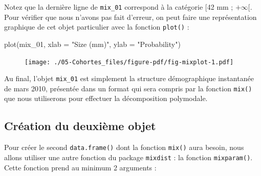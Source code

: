 \documentclass[
  a4paper,
  DIV=11,
  numbers=noendperiod,
  oneside]{scrreprt}
\newenvironment{Shaded}{}{}
\newcommand{\AttributeTok}[1]{\textcolor[rgb]{0.84,0.23,0.29}{#1}}
\newcommand{\FunctionTok}[1]{\textcolor[rgb]{0.44,0.26,0.76}{#1}}
\newcommand{\NormalTok}[1]{\textcolor[rgb]{0.14,0.16,0.18}{#1}}
\newcommand{\StringTok}[1]{\textcolor[rgb]{0.01,0.18,0.38}{#1}}
\begin{document}
Notez que la dernière ligne de \texttt{mix\_01} correspond à la
catégorie {[}42 mm ; \(+\infty\){[}. Pour vérifier que nous n'avons pas
fait d'erreur, on peut faire une représentation graphique de cet objet
particulier avec la fonction \texttt{plot()} :

\begin{Shaded}
\begin{Highlighting}[]
\FunctionTok{plot}\NormalTok{(mix\_01, }\AttributeTok{xlab =} \StringTok{"Size (mm)"}\NormalTok{, }\AttributeTok{ylab =} \StringTok{"Probability"}\NormalTok{)}
\end{Highlighting}
\end{Shaded}

\begin{figure}


{\centering \texttt{[image: ./05-Cohortes\_files/figure-pdf/fig-mixplot-1.pdf]}

}

\end{figure}


Au final, l'objet \texttt{mix\_01} est simplement la structure
démographique instantanée de mars 2010, présentée dans un format qui
sera compris par la fonction \texttt{mix()} que nous utiliserons pour
effectuer la décomposition polymodale.

\hypertarget{cruxe9ation-du-deuxiuxe8me-objet}{%
\subsection{Création du deuxième
objet}\label{cruxe9ation-du-deuxiuxe8me-objet}}

Pour créer le second \texttt{data.frame()} dont la fonction
\texttt{mix()} aura besoin, nous allons utiliser une autre fonction du
package \texttt{mixdist} : la fonction \texttt{mixparam()}. Cette
fonction prend au minimum 2 arguments :
\end{document}

